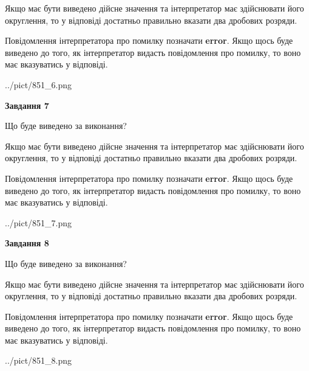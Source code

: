 \documentclass[12pt, ukrainian]{article}
\begin{document}
{\begin {Large}
Якщо має бути виведено дійсне значення та інтерпретатор має здійснювати його округлення, 
то у відповіді достатньо правильно вказати два дробових розряди.

Повідомлення інтерпретатора про помилку позначати \textbf{error}.
Якщо щось буде виведено до того, як інтерпретатор видасть повідомлення про помилку, 
то воно має вказуватись у відповіді. \par

\begin{center}
	{../pict/851_6.png}
\end{center}
\newpage

{\begin {center}\textbf{Завдання 7}\end {center}}\par
Що буде виведено за виконання? \par

Якщо має бути виведено дійсне значення та інтерпретатор має здійснювати його округлення, 
то у відповіді достатньо правильно вказати два дробових розряди.

Повідомлення інтерпретатора про помилку позначати \textbf{error}.
Якщо щось буде виведено до того, як інтерпретатор видасть повідомлення про помилку, 
то воно має вказуватись у відповіді. \par

\begin{center}
	{../pict/851_7.png}
\end{center}
\newpage

{\begin {center}\textbf{Завдання 8}\end {center}}\par
Що буде виведено за виконання? \par

Якщо має бути виведено дійсне значення та інтерпретатор має здійснювати його округлення, 
то у відповіді достатньо правильно вказати два дробових розряди.

Повідомлення інтерпретатора про помилку позначати \textbf{error}.
Якщо щось буде виведено до того, як інтерпретатор видасть повідомлення про помилку, 
то воно має вказуватись у відповіді. \par

\begin{center}
	{../pict/851_8.png}
\end{center}
\newpage


\end{Large}}
\end{document}
